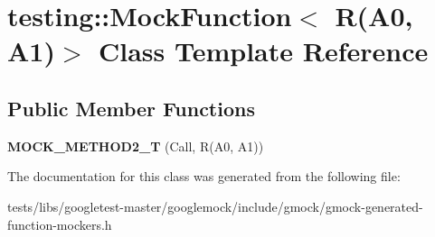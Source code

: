 \hypertarget{classtesting_1_1MockFunction_3_01R_07A0_00_01A1_08_4}{}\section{testing\+:\+:Mock\+Function$<$ R(A0, A1)$>$ Class Template Reference}
\label{classtesting_1_1MockFunction_3_01R_07A0_00_01A1_08_4}
\subsection*{Public Member Functions}
\begin{DoxyCompactItemize}
\item 
\mbox{\label{classtesting_1_1MockFunction_3_01R_07A0_00_01A1_08_4_a5a4d673a3252cab866f0a4fa97486190}} 
{\bfseries M\+O\+C\+K\+\_\+\+M\+E\+T\+H\+O\+D2\+\_\+T} (Call, R(A0, A1))
\end{DoxyCompactItemize}


The documentation for this class was generated from the following file\+:\begin{DoxyCompactItemize}
\item 
tests/libs/googletest-\/master/googlemock/include/gmock/gmock-\/generated-\/function-\/mockers.\+h\end{DoxyCompactItemize}
